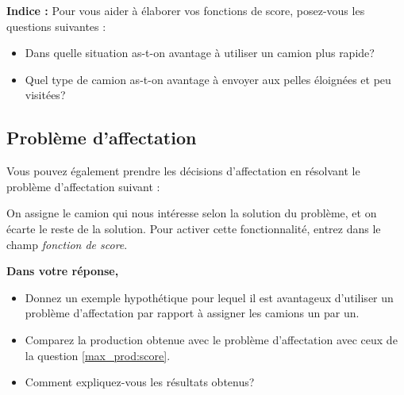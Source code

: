 \textbf{Indice : }Pour vous aider à élaborer vos fonctions de score, posez-vous les questions suivantes : 
\begin{itemize}
	\item Dans quelle situation as-t-on avantage à utiliser un camion plus rapide?
	\item Quel type de camion as-t-on avantage à envoyer aux pelles éloignées et peu visitées?
\end{itemize}

\subsection{Problème d'affectation}

Vous pouvez également prendre les décisions d'affectation en résolvant le problème d'affectation suivant : 


On assigne le camion qui nous intéresse selon la solution du problème, et on écarte le reste de la solution. Pour activer cette fonctionnalité, entrez  dans le champ \textit{fonction de score}.

\vspace{10pt}
\noindent\textbf{Dans votre réponse,} 

\begin{itemize}
	\item Donnez un exemple hypothétique pour lequel il est avantageux d'utiliser un problème d'affectation par rapport à assigner les camions un par un.
	\item Comparez la production obtenue avec le problème d'affectation avec ceux de la question \ref{max_prod:score}. 
	\item Comment expliquez-vous les résultats obtenus?
\end{itemize}




